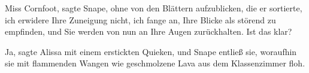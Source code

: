 \glqq{}Miss Cornfoot\grqq{}, sagte Snape, ohne von den Blättern aufzublicken, die
er sortierte, \glqq{}ich erwidere Ihre Zuneigung nicht, ich fange an, Ihre Blicke
als störend zu empfinden, und Sie werden von nun an Ihre Augen zurückhalten. Ist
das klar?\grqq{}

\glqq{}Ja\grqq{}, sagte Alissa mit einem erstickten Quieken, und Snape entließ
sie, woraufhin sie mit flammenden Wangen wie geschmolzene Lava aus dem
Klassenzimmer floh.

